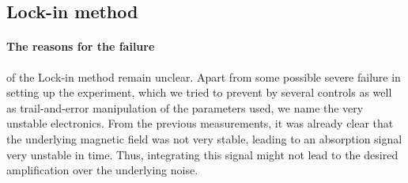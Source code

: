 \subsection{Lock-in method}
\paragraph{The reasons for the failure} 
of the Lock-in method remain unclear. Apart from some possible severe 
failure in setting up the experiment, which we tried to prevent by several 
controls as well as trail-and-error manipulation of the parameters used, 
we name the very unstable electronics. From the previous measurements, it was 
already clear that the underlying magnetic field was not very stable, leading 
to an absorption signal very unstable in time. Thus, integrating this signal 
might not lead to the desired amplification over the underlying noise. 


